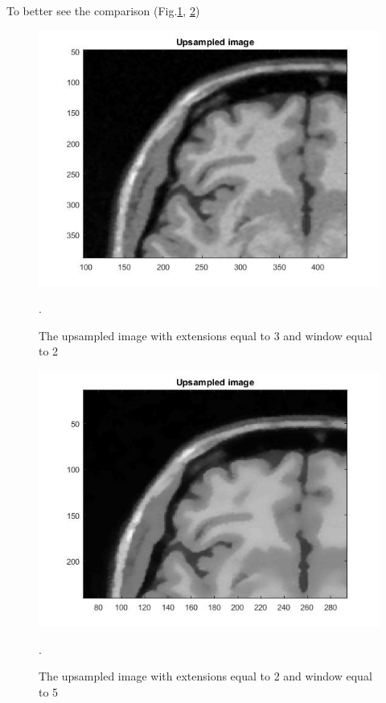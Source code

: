 To better see the comparison (Fig.\ref{fig: Module10_6_b}, \ref{fig: Module10_7_b})

\begin{figure}[H]
\centering{}\includegraphics[scale=0.4]{figures/Module_10/Module10_6_b}\caption{The upsampled image with extensions equal to 3 and window equal to 2}. 
\label{fig: Module10_6_b}
\end{figure}

\begin{figure}[H]
\centering{}\includegraphics[scale=0.4]{figures/Module_10/Module10_7_b}\caption{The upsampled image with extensions equal to 2 and window equal to 5}. 
\label{fig: Module10_7_b}
\end{figure}

